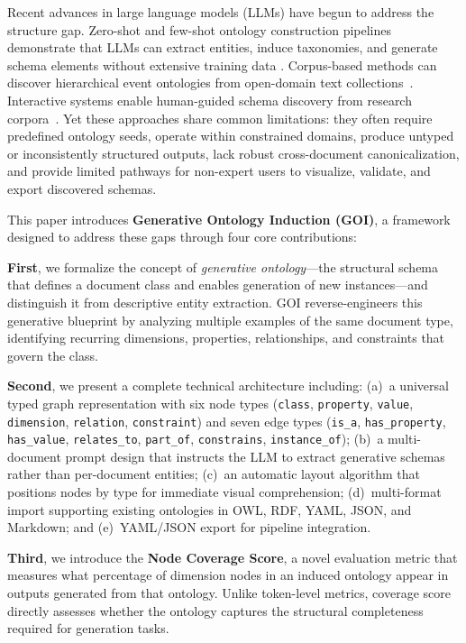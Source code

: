 \documentclass[runningheads,a4paper]{llncs}
\begin{document}
Recent advances in large language models (LLMs) have begun to address
the structure gap. Zero-shot and few-shot ontology construction pipelines
demonstrate that LLMs can extract entities, induce taxonomies, and
generate schema elements without extensive training data
\cite{beliaeva2025,zhang2024zero,kumar2023iterative}. Corpus-based
methods can discover hierarchical event ontologies from open-domain text
collections~\cite{zhang2023ceo}. Interactive systems enable human-guided
schema discovery from research corpora~\cite{sadruddin2025}. Yet these
approaches share common limitations: they often require predefined
ontology seeds, operate within constrained domains, produce untyped or
inconsistently structured outputs, lack robust cross-document
canonicalization, and provide limited pathways for non-expert users to
visualize, validate, and export discovered schemas.

This paper introduces \textbf{Generative Ontology Induction (GOI)}, a
framework designed to address these gaps through four core contributions:

\textbf{First}, we formalize the concept of \emph{generative
ontology}---the structural schema that defines a document class and
enables generation of new instances---and distinguish it from
descriptive entity extraction. GOI reverse-engineers this generative
blueprint by analyzing multiple examples of the same document type,
identifying recurring dimensions, properties, relationships, and
constraints that govern the class.

\textbf{Second}, we present a complete technical architecture including:
(a)~a universal typed graph representation with six node types
(\texttt{class}, \texttt{property}, \texttt{value}, \texttt{dimension},
\texttt{relation}, \texttt{constraint}) and seven edge types
(\texttt{is\_a}, \texttt{has\_property}, \texttt{has\_value},
\texttt{relates\_to}, \texttt{part\_of}, \texttt{constrains},
\texttt{instance\_of}); (b)~a multi-document prompt design that instructs
the LLM to extract generative schemas rather than per-document entities;
(c)~an automatic layout algorithm that positions nodes by type for
immediate visual comprehension; (d)~multi-format import supporting
existing ontologies in OWL, RDF, YAML, JSON, and Markdown; and
(e)~YAML/JSON export for pipeline integration.

\textbf{Third}, we introduce the \textbf{Node Coverage Score}, a novel
evaluation metric that measures what percentage of dimension nodes in an
induced ontology appear in outputs generated from that ontology. Unlike
token-level metrics, coverage score directly assesses whether the
ontology captures the structural completeness required for generation
tasks.
\end{document}
